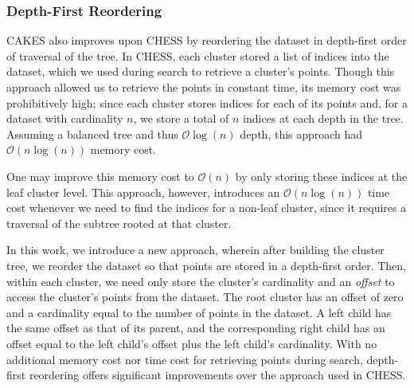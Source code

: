 \subsubsection {Depth-First Reordering}
\label{subsubsec:methods:clustering:dataset-depth-first-reordering}

CAKES also improves upon CHESS by reordering the dataset in depth-first order of traversal of the tree.
In CHESS, each cluster stored a list of indices into the dataset, which we used during search to retrieve a cluster's points. 
Though this approach allowed us to retrieve the points in constant time, its memory cost was prohibitively high;
since each cluster stores indices for each of its points and, for a dataset with cardinality $n$, we store a total of $n$ indices at each depth in the tree.
Assuming a balanced tree and thus $\mathcal{O}\log(n)$ depth, this approach had $\mathcal{O}(n\log(n))$ memory cost.

One may improve this memory cost to $\mathcal{O}(n)$ by only storing these indices at the leaf cluster level.
This approach, however, introduces an $\mathcal{O}(n\log(n))$ time cost whenever we need to find the indices for 
a non-leaf cluster, since it requires a traversal of the subtree rooted at that cluster.

In this work, we introduce a new approach, wherein after building the cluster tree, we reorder the dataset so that points are stored in a depth-first order.
Then, within each cluster, we need only store the cluster's cardinality and an \emph{offset} to access the cluster's points from the dataset.
The root cluster has an offset of zero and a cardinality equal to the number of points in the dataset.
A left child has the same offset as that of its parent, and the corresponding right child has an offset equal to the left child's offset plus the left child's cardinality.
With no additional memory cost nor time cost for retrieving points during search, depth-first reordering offers significant improvements over the approach used in CHESS.





